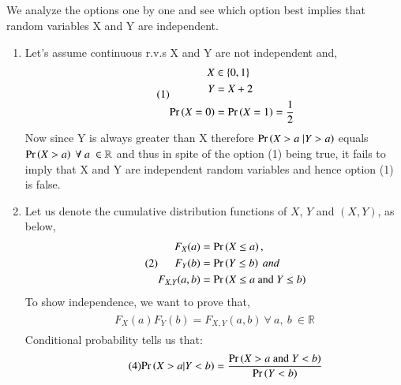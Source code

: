 \documentclass[journal,12pt,twocolumn]{IEEEtran}
\begin{document}
\subsection*{}
We analyze the options one by one and see which option best implies that random variables X and Y are independent. \\
\begin{enumerate}
    \item Let's assume continuous r.v.s X and Y are not independent and, \\
\begin{align}\tag{1}
    \begin{split}
        X &\in \{0, 1\}\\
        Y &= X + 2\\
        \Pr\left(X=0\right) &= \Pr\left(X=1\right) = \dfrac{1}{2}\\
    \end{split}
\end{align}
Now since Y is always greater than X therefore $\Pr\left(X>a \;| Y>a\right)$ equals $\Pr\left(X > a\right)\ \forall\ a\ \in \mathbb{R}$ and thus in spite of the option (1) being true, it fails to imply that X and Y are independent random variables and hence option (1) is false.\\
    \item Let us denote the cumulative distribution functions of $X$, $Y$ and $(X, Y)$, as below,\\
\begin{align}\tag{2}
    \begin{split}
        F_X(a) &= \Pr\left(X \leq a\right),\\
        F_Y(b) &= \Pr\left(Y \leq b\right)\ and \\
        F_{X,Y}(a,b) &= \Pr\left(X \leq a \mbox{ and } Y \leq b\right)
    \end{split}
\end{align}
To show independence, we want to prove that,
\begin{align}\tag{3}
    \begin{split}
        F_X(a)F_Y(b) = F_{X, Y}(a,b)\ \forall\ a,\ b\ \in \mathbb{R}
    \end{split}
\end{align}
Conditional probability tells us that: 
\begin{align}\tag{4}
    \begin{split}
        \Pr\left(X > a | Y < b\right) = \frac{\Pr\left(X > a \mbox{ and } Y < b\right)}{\Pr\left(Y < b\right)}
    \end{split}
\end{align}

\end{enumerate}
\end{document}
